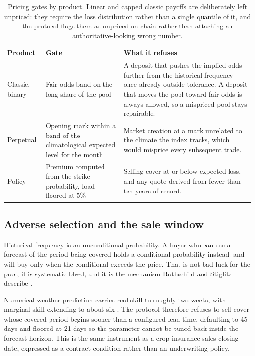 \documentclass[11pt,a4paper]{article}
\begin{document}
\begin{table}[htbp]
\centering
\small
\setlength{\tabcolsep}{6pt}
\renewcommand{\arraystretch}{1.3}
\begin{tabularx}{\linewidth}{@{}l>{\raggedright\arraybackslash}X>{\raggedright\arraybackslash}X@{}}
\toprule
\textbf{Product} & \textbf{Gate} & \textbf{What it refuses} \\
\midrule
Classic, binary & Fair-odds band on the long share of the pool & A deposit that pushes the
implied odds further from the historical frequency once already outside tolerance. A deposit
that moves the pool toward fair odds is always allowed, so a mispriced pool stays repairable. \\
Perpetual & Opening mark within a band of the climatological expected level for the month &
Market creation at a mark unrelated to the climate the index tracks, which would misprice
every subsequent trade. \\
Policy & Premium computed from the strike probability, load floored at 5\% &
Selling cover at or below expected loss, and any quote derived from fewer than ten years of
record. \\
\bottomrule
\end{tabularx}
\caption{Pricing gates by product. Linear and capped classic payoffs are deliberately left
unpriced: they require the loss distribution rather than a single quantile of it, and the
protocol flags them as unpriced on-chain rather than attaching an authoritative-looking
wrong number.}
\label{tab:gates}
\end{table}

\subsection{Adverse selection and the sale window}

Historical frequency is an unconditional probability. A buyer who can see a forecast of the
period being covered holds a conditional probability instead, and will buy only when the
conditional exceeds the price. That is not bad luck for the pool; it is systematic bleed, and
it is the mechanism Rothschild and Stiglitz describe \cite{rothschild1976}.

Numerical weather prediction carries real skill to roughly two weeks, with marginal skill
extending to about six \cite{bauer2015}. The protocol therefore refuses to sell cover whose
covered period begins sooner than a configured lead time, defaulting to 45 days and floored
at 21 days so the parameter cannot be tuned back inside the forecast horizon. This is the
same instrument as a crop insurance sales closing date, expressed as a contract condition
rather than an underwriting policy.
\end{document}
